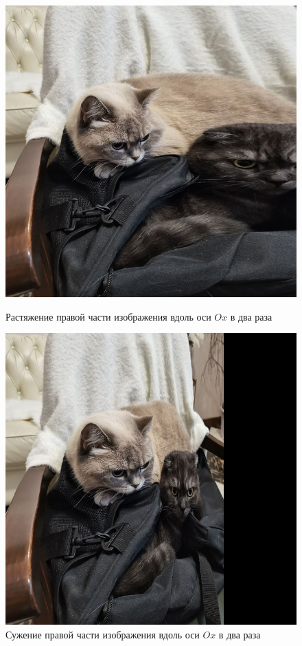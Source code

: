 \documentclass[a4paper, 16pt]{article}
\begin{document}
\newpage
\begin{figure}[!htb]
    \centering
    \begin{minipage}{0.45\textwidth}
        \centering
        \includegraphics[scale=0.3]{piecewiselinear2.png}
        \captionsetup{skip=0pt}
        \caption{Растяжение правой части изображения вдоль оси $Ox$ в два раза}
        \label{Рис:11}
    \end{minipage}
    \begin{minipage}{0.45\textwidth}
        \centering
        \includegraphics[scale=0.3]{piecewiselinear05.png}
        \captionsetup{skip=0pt}
        \caption{Сужение правой части изображения вдоль оси $Ox$ в два раза}
        \label{Рис:12}
    \end{minipage}
\end{figure}
\end{document}

